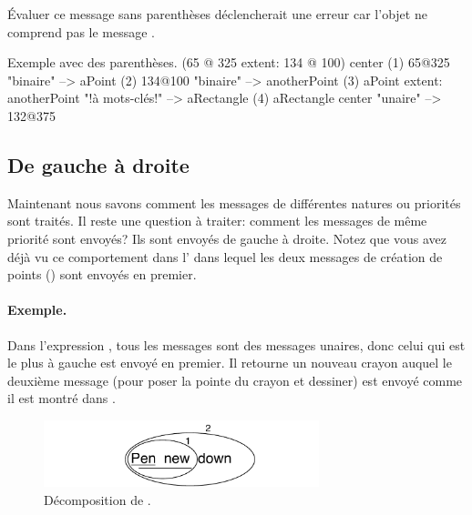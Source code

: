 \documentclass[a4paper,10pt,twoside]{book}
\begin{document}
Évaluer ce message sans parenthèses déclencherait une erreur car
l'objet  ne comprend pas le message .

\begin{example}[decExtent]{Exemple avec des parenthèses.}{}
      (65 @ 325 extent: 134 @ 100) center
(1)   65@325                                                    "binaire"
    --> aPoint
(2)                                134@100                     "binaire"
                                 --> anotherPoint
(3)   aPoint extent: anotherPoint                       "!à mots-clés!"
      --> aRectangle
(4)   aRectangle center                                     "unaire"
      --> 132@375
\end{example}

\subsection{De gauche à droite}
Maintenant nous savons comment les messages de différentes natures
ou priorités sont traités. Il reste une question à traiter:
comment les messages de même priorité sont envoyés? Ils sont
envoyés de gauche à droite. Notez que vous avez déjà vu ce
comportement dans l' dans lequel les deux messages de
création de points () sont envoyés en premier.



\paragraph{Exemple.} Dans l'expression , tous les
messages sont des messages unaires, donc celui qui est le plus à
gauche  est envoyé en premier. Il retourne un nouveau
crayon auquel le deuxième message  
(pour poser la pointe du crayon et dessiner)
est envoyé comme il est montré dans .

\begin{figure}
	\centering
	\includegraphics[width=8cm]{ucompoUn}
	\caption{Décomposition de .}
\end{figure}
\end{document}
